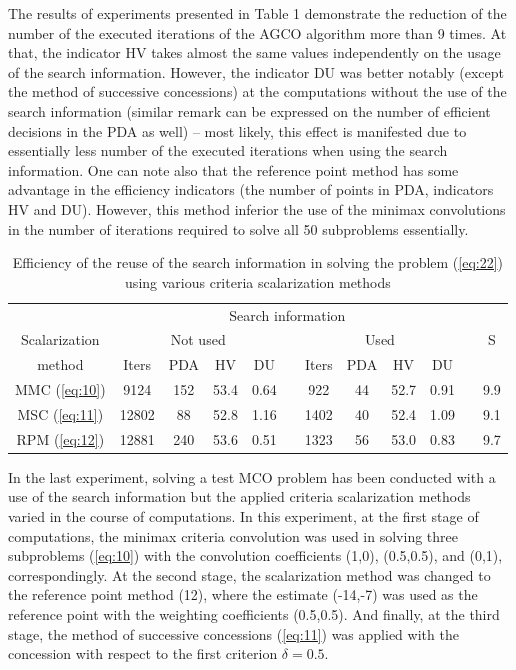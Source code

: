 \documentclass[runningheads]{llncs}
\begin{document}
The results of experiments presented in Table 1 demonstrate the reduction of the number of the executed iterations of the AGCO algorithm more than 9 times. At that, the indicator HV takes almost the same values independently on the usage of the search information. However, the indicator DU was better notably (except the method of successive concessions) at the computations without the use of the search information (similar remark can be expressed on the number of efficient decisions in the PDA as well) -- most likely, this effect is manifested due to essentially less number of the executed iterations when using the search information. One can note also that the reference point method has some advantage in the efficiency indicators (the number of points in PDA, indicators HV and DU). However, this method inferior the use of the minimax convolutions in the number of iterations required to solve all 50 subproblems essentially.

\begin{table}[t]
\centering
\caption{Efficiency of the reuse of the search information in solving the problem (\ref{eq:22}) using various criteria scalarization methods}
\label{tab:01}
\begin{tabular}{ccccclcccclc}
\hline
              & \multicolumn{9}{c}{Search information}                      &  &     \\ \cline{2-10}
Scalarization & \multicolumn{4}{c}{Not used} &  & \multicolumn{4}{c}{Used}  &  & S   \\ \cline{2-5} \cline{7-10}
method        & Iters  & PDA  & HV    & DU   &  & Iters & PDA & HV   & DU   &  &     \\ \cline{1-5} \cline{7-10} \cline{12-12} 
MMC (\ref{eq:10})      & 9124   & 152  & 53.4  & 0.64 &  & 922   & 44  & 52.7 & 0.91 &  & 9.9 \\
MSC (\ref{eq:11})      & 12802  & 88   & 52.8  & 1.16 &  & 1402  & 40  & 52.4 & 1.09 &  & 9.1 \\
RPM (\ref{eq:12})      & 12881  & 240  & 53.6  & 0.51 &  & 1323  & 56  & 53.0 & 0.83 &  & 9.7 \\ \hline
\end{tabular}
\end{table}

In the last experiment, solving a test MCO problem has been conducted with a use of the search information but the applied criteria scalarization methods varied in the course of computations. In this experiment, at the first stage of computations, the minimax criteria convolution was used in solving three subproblems (\ref{eq:10}) with the convolution coefficients (1,0), (0.5,0.5), and (0,1), correspondingly. At the second stage, the scalarization method was changed to the reference point method (12), where the estimate (-14,-7) was used as the reference point with the weighting coefficients (0.5,0.5). And finally, at the third stage, the method of successive concessions (\ref{eq:11}) was applied with the concession with respect to the first criterion $\delta=0.5$.
\end{document}
